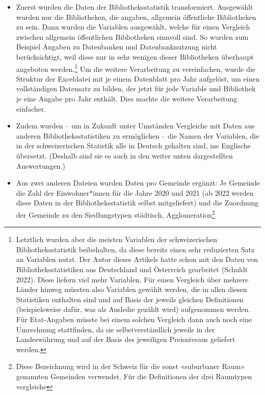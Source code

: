 \documentclass[a4paper,
fontsize=11pt,
oneside,
numbers=noperiodatend,
parskip=half-,
bibliography=totoc,
final
]{scrartcl}
\begin{document}
\begin{itemize}
\item
  Zuerst wurden die Daten der Bibliotheksstatistik transformiert.
  Ausgewählt wurden nur die Bibliotheken, die angaben, allgemein
  öffentliche Bibliotheken zu sein. Dann wurden die Variablen
  ausgewählt, welche für einen Vergleich zwischen allgemein öffentlichen
  Bibliotheken sinnvoll sind. So wurden zum Beispiel Angaben zu
  Datenbanken und Datenbanknutzung nicht berücksichtigt, weil diese nur
  in sehr wenigen dieser Bibliotheken überhaupt angeboten
  werden.\footnote{Letztlich wurden aber die meisten Variablen der
    schweizerischen Bibliotheksstatistik beibehalten, da diese bereits
    einen sehr reduzierten Satz an Variablen nutzt. Der Autor dieses
    Artikels hatte schon mit den Daten von Bibliotheksstatistiken aus
    Deutschland und Österreich gearbeitet (Schuldt 2022). Diese liefern
    viel mehr Variablen. Für einen Vergleich über mehrere Länder hinweg
    müssten also Variablen gewählt werden, die in allen diesen
    Statistiken enthalten sind und auf Basis der jeweils gleichen
    Definitionen (beispielsweise dafür, was als Ausleihe gezählt wird)
    aufgenommen werden. Für Etat-Angaben müsste bei einem solchen
    Vergleich dann auch noch eine Umrechnung stattfinden, da sie
    selbstverständlich jeweils in der Landeswährung und auf der Basis
    des jeweiligen Preisniveaus geliefert werden.} Um die weitere
  Verarbeitung zu vereinfachen, wurde die Struktur der Exceldatei mit je
  einem Datenblatt pro Jahr aufgelöst, um einen vollständigen Datensatz
  zu bilden, der jetzt für jede Variable und Bibliothek je eine Angabe
  pro Jahr enthält. Dies machte die weitere Verarbeitung einfacher.
\item
  Zudem wurden -- um in Zukunft unter Umständen Vergleiche mit Daten aus
  anderen Bibliotheksstatistiken zu ermöglichen -- die Namen der
  Variablen, die in der schweizerischen Statistik alle in Deutsch
  gehalten sind, ins Englische übersetzt. (Deshalb sind sie es auch in
  den weiter unten dargestellten Auswertungen.)
\item
  Aus zwei anderen Dateien wurden Daten pro Gemeinde ergänzt: Je
  Gemeinde die Zahl der Einwohner*innen für die Jahre 2020 und 2021 (ab
  2022 werden diese Daten in der Bibliotheksstatistik selbst
  mitgeliefert) und die Zuordnung der Gemeinde zu den Siedlungstypen
  städtisch, Agglomeration\footnote{Diese Bezeichnung wird in der
    Schweiz für die sonst «suburbaner Raum» genannten Gemeinden
    verwendet. Für die Definitionen der drei Raumtypen vergleiche
}
\end{itemize}
\end{document}
